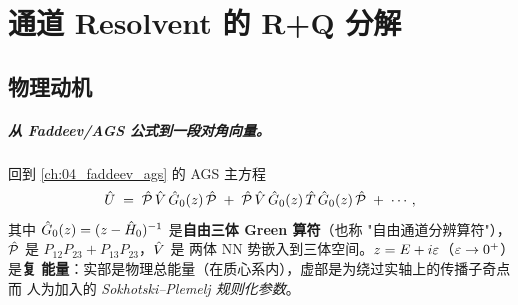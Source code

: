 
\chapter{通道 Resolvent 的 R+Q 分解}
\label{ch:10_resolvent}

\providecommand{\Rterm}{R}                        %
\providecommand{\Qterm}{Q}                        %
\providecommand{\Greschan}{\hat{G}_{0}^{(\alpha)}}%
\providecommand{\GreschanMat}{\mathbf{G}_0}       %
\providecommand{\Eb}{E_b}                         %
\providecommand{\BCcell}{\Rterm_{i,j}^{(\alpha)}} %
\providecommand{\CCcell}{\Qterm_{i,j}^{(\alpha)}} %
\providecommand{\Eqcell}{{\mathcal{E}_{j}^{q}}}   %
\providecommand{\Epcell}{{\mathcal{E}_{i}^{p}}}   %
\providecommand{\DeltaP}{\Delta_{+}}              %
\providecommand{\DeltaM}{\Delta_{-}}              %

\section{物理动机}
\label{sec:ch10-motivation}

\paragraph{从 Faddeev/AGS 公式到一段对角向量。}
回到 \cref{ch:04_faddeev_ags} 的 AGS 主方程
\begin{equation}
\label{eq:ch10-AGS-recall}
\hat{U} \;=\; \hat{\mathcal{P}}\, \hat{V}\, \hat{G}_0(z)\, \hat{\mathcal{P}} \;+\; \hat{\mathcal{P}}\, \hat{V}\, \hat{G}_0(z)\, \hat{T}\, \hat{G}_0(z)\, \hat{\mathcal{P}} \;+\; \cdots,
\end{equation}
其中 \(\hat{G}_0(z) = (z - \hat{H}_0)^{-1}\) 是\textbf{自由三体 Green 算符}（也称
"自由通道分辨算符"），\(\hat{\mathcal{P}}\) 是 \(P_{12}P_{23}+P_{13}P_{23}\)，\(\hat{V}\) 是
两体 NN 势嵌入到三体空间。\(z = E + i\varepsilon\)（\(\varepsilon \to 0^{+}\)）是\textbf{复
能量}：实部是物理总能量（在质心系内），虚部是为绕过实轴上的传播子奇点而
人为加入的 \emph{Sokhotski--Plemelj 规则化参数}。

